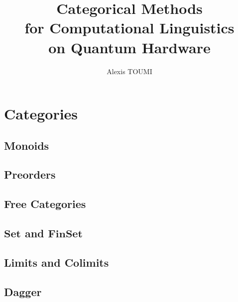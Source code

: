 

\title{Categorical Methods\\
for Computational Linguistics\\
on Quantum Hardware}
\author{Alexis TOUMI}

\degreedate{\today}


\begin{romanpages}
\maketitle



\tableofcontents

\end{romanpages}

\chapter{Categories}

    \section{Monoids}
    \section{Preorders}
    \section{Free Categories}
    \section{$\mathbf{Set}$ and $\mathbf{FinSet}$}
    \section{Limits and Colimits}
    \section{Dagger}
